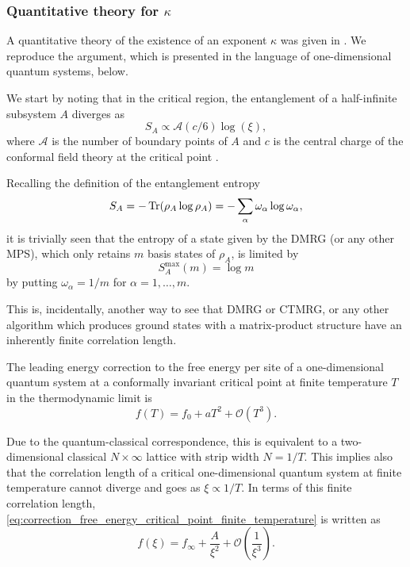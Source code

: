 \subsubsection{Quantitative theory for $\kappa$}
A quantitative theory of the existence of an exponent $\kappa$ was given in \cite{pollmann2009theory}.
We reproduce the argument, which is presented in the language of one-dimensional quantum systems, below.

We start by noting that in the critical region, the entanglement of a half-infinite subsystem $A$ diverges as
\begin{equation}\label{eq:entropy_scaling_near_criticality}
  S_A \propto \mathcal{A}(c/6)\log(\xi),
\end{equation}
where $\mathcal{A}$ is the number of boundary points of $A$ and $c$ is the central charge of the conformal field theory
at the critical point \cite{calabrese2004entanglement, vidal2003entanglement, ercolessi2010exact}.

Recalling the definition of the entanglement entropy
\begin{equation}
  S_A = - \operatorname{Tr}(\rho_A \log \rho_A) = - \sum_{\alpha} \omega_{\alpha} \log \omega_{\alpha},
\end{equation}
it is trivially seen that the entropy of a state given by the DMRG (or any other MPS), which only
retains $m$ basis states of $\rho_A$, is limited by
\begin{equation}
  S^{\text{max}}_A(m) = \log m
\end{equation}
by putting $\omega_{\alpha} = 1/m$ for $\alpha = 1, \dots, m$.

This is, incidentally, another way to see that DMRG or CTMRG, or any other algorithm which produces ground states with a
matrix-product structure have an inherently finite correlation length.

The leading energy correction to the free energy per site of a one-dimensional quantum system at a conformally invariant
critical point at finite temperature $T$ in the thermodynamic limit is \cite{affleck1986universal}
\begin{equation}\label{eq:correction_free_energy_critical_point_finite_temperature}
  f(T) = f_0 + aT^2 + \mathcal{O}(T^3).
\end{equation}

Due to the quantum-classical correspondence, this is equivalent to a two-dimensional classical $N \times \infty$ lattice
with strip width $N = 1/T$.
This implies also that the correlation length of a critical one-dimensional quantum system at finite temperature cannot
diverge and goes as $\xi \propto 1/T$.
In terms of this finite correlation length, \autoref{eq:correction_free_energy_critical_point_finite_temperature} is
written as
\begin{equation}\label{eq:correction_free_energy_critical_point_finite_correlation_length}
  f(\xi) = f_{\infty} + \frac{A}{\xi^2} + \mathcal{O(\frac{1}{\xi^3})}.
\end{equation}

